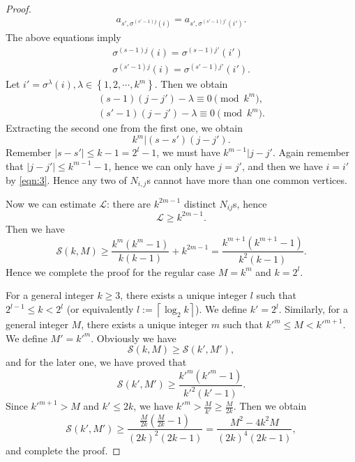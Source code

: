 \begin{proof}
\begin{equation*}
\begin{aligned}
		a_{s',\sigma^{(s'-1)j}(i)}=a_{s',\sigma^{(s'-1)j'}(i')}.
	\end{aligned}
\end{equation*}
The above equations imply
\begin{equation}\label{eqn:3}
	\begin{aligned}
		\sigma^{(s-1)j}(i)=\sigma^{(s-1)j'}(i')\\
		\sigma^{(s'-1)j}(i)=\sigma^{(s'-1)j'}(i').
	\end{aligned}
\end{equation}
Let $i'=\sigma^{\lambda}(i),\lambda \in \left\{1,2,\cdots ,k^{m}\right\} $. Then we obtain
\begin{equation*}
	\begin{aligned}
		(s-1)(j-j')-\lambda\equiv 0\pmod{k^{m}},\\
		(s'-1)(j-j')-\lambda\equiv 0\pmod{k^{m}}.
	\end{aligned}
\end{equation*}
Extracting the second one from the first one, we obtain
\[
	k^{m}\lvert (s-s')(j-j').
\]
Remember $|s-s'|\le k-1=2^{l}-1$, we must have $k^{m-1}\lvert j-j'$. Again remember that $|j-j'|\le k^{m-1}-1$, hence we can only have $j=j'$, and then we have  $i=i'$ by \cref{eqn:3}. Hence any two of $N_{i,j}$s cannot have more than one common vertices. 

Now we can estimate $\mathcal{L}$: there are $k^{2m-1}$ distinct $N_{ij}$s, hence 
\[
\mathcal{L}\ge k^{2m-1}.
\]
Then we have
\begin{equation*}
	\mathcal{S}(k,M)\ge \frac{k^{m}(k^{m}-1)}{k(k-1)}+k^{2m-1}= \frac{k^{m+1}(k^{m+1}-1)}{k^2(k-1)}.
\end{equation*}
Hence we complete the proof for the regular case $M=k^{m}$ and $k=2^{l}$.

For a general integer $k\ge 3$, there exists a unique integer $l$ such that $2^{l-1}\le k<2^l$ (or equivalently $l:= \left\lceil \log_2 k \right\rceil $). We define $k'=2^{l}$. Similarly, for a general integer $M$, there exists a unique integer  $m$ such that  $k'^{m}\le M<k'^{m+1}$. We define $M'=k'^{m}$. Obviously we have
\[
\mathcal{S}(k,M)\ge \mathcal{S}(k',M'),
\] 
and for the later one, we have proved that
\[
\mathcal{S}(k',M')\ge \frac{k'^{m}(k'^{m}-1)}{k'^2(k'-1)}.
\]
Since $k'^{m+1}>M$ and $k'\le 2 k$, we have $\displaystyle k'^{m}>\frac{M}{k'}\ge \frac{M}{2k}$. Then we obtain
 \[
\mathcal{S}(k',M')\ge \frac{\frac{M}{2k}\left( \frac{M}{2k}-1 \right) }{(2k)^2(2k-1)}= \frac{M^2-4k^2M}{(2k)^{4}(2k-1)},
\] 
and complete the proof.
\end{proof}
